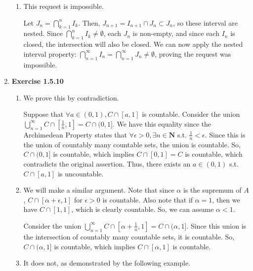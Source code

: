 \documentclass{article}
\begin{document}
\begin{enumerate}
\begin{enumerate}
        \item This request is impossible. 
        
        Let $J_n = \bigcap_{k=1}^n I_k$. Then, $J_{n+1} = I_{n+1} \cap J_n \subset J_n$, so these interval are nested. Since $\bigcap_{k=1}^n I_k \neq \emptyset$, each $J_n$ is non-empty, and since each $I_n$ is closed, the intersection will also be closed. We can now apply the nested interval property: $\bigcap_{n=1}^\infty I_n = \bigcap_{n=1}^\infty J_n \neq \emptyset$, proving the request was impossible. 
    \end{enumerate}

    \item \textbf{Exercise 1.5.10}
        \begin{enumerate}
            \item We prove this by contradiction. 

            Suppose that $\forall a \in (0, 1), C \cap [a, 1]$ is countable. Consider the union $\bigcup_{n=1}^\infty C \cap \left[\frac{1}{n}, 1\right] = C \cap (0, 1]$. We have this equality since the Archimedean Property states that $\forall \epsilon > 0,\exists n \in \mathbf{N}$ s.t. $\frac{1}{n} < \epsilon$. Since this is the union of countably many countable sets, the union is countable. So, $C \cap (0, 1]$ is countable, which implies $C \cap [0, 1] = C$ is countable, which contradicts the original assertion. Thus, there exists an $a \in (0, 1)$ s.t. $C \cap [a, 1]$ is uncountable. 

            \item We will make a similar argument. Note that since $\alpha$ is the supremum of $A$, $C \cap [\alpha + \epsilon, 1]$ for $\epsilon > 0$ is countable. Also note that if $\alpha = 1$, then we have $C \cap [1, 1]$, which is clearly countable. So, we can assume $\alpha < 1$.

            Consider the union $\bigcup_{n=1}^\infty C \cap [\alpha + \frac{1}{n}, 1] = C \cap (\alpha, 1]$. Since this union is the intersection of countably many countable sets, it is countable. So, $C \cap (\alpha, 1]$ is countable, which implies $C \cap [\alpha, 1]$ is countable. 

            \item It does not, as demonstrated by the following example. 


\end{enumerate}
\end{enumerate}
\end{document}
